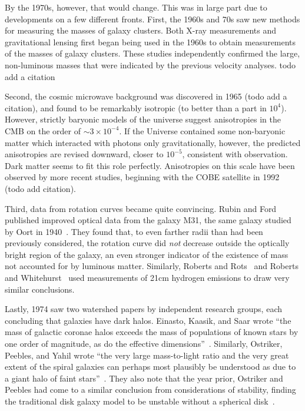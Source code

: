 By the 1970s, however, that would change. This was in large part due to
developments on a few different fronts. First, the 1960s and 70s saw new
methods for measuring the masses of galaxy clusters. Both X-ray measurements
and gravitational lensing first began being used in the 1960s to obtain
measurements of the masses of galaxy clusters. These studies independently
confirmed the large, non-luminous masses that were indicated by the previous
velocity analyses. todo add a citation

Second, the cosmic microwave background was discovered in 1965 (todo add a
citation), and found to be remarkably isotropic (to better than a part in
\(10^4\)). However, strictly baryonic models of the universe suggest
anisotropies in the CMB on the order of \(\sim 3 \times 10^{-4}\). If the
Universe contained some non-baryonic matter which interacted with photons only
gravitationally, however, the predicted anisotropies are revised downward,
closer to \(10^{-5}\), consistent with observation. Dark matter seems to fit
this role perfectly. Anisotropies on this scale have been observed by more
recent studies, beginning with the COBE satellite in 1992 (todo add citation).

Third, data from rotation curves became quite convincing. Rubin and Ford
published improved optical data from the galaxy M31, the same galaxy studied
by Oort in 1940~\cite{rubin_rotation_1970}. They found that, to even farther
radii than had been previously considered, the rotation curve did \emph{not}
decrease outside the optically bright region of the galaxy, an even stronger
indicator of the existence of mass not accounted for by luminous matter.
Similarly, Roberts and Rots~\cite{roberts_comparison_1973} and Roberts and
Whitehurst~\cite{roberts_rotation_1975} used measurements of 21cm hydrogen
emissions to draw very similar conclusions.

Lastly, 1974 saw two watershed papers by independent research groups, each
concluding that galaxies have dark halos. Einasto, Kaasik, and Saar wrote
``the mass of galactic coronae halos exceeds the mass of populations of known
stars by one order of magnitude, as do the effective
dimensions''~\cite{einasto_missing_1974}. Similarly, Ostriker, Peebles, and
Yahil wrote ``the very large mass-to-light ratio and the very great extent of
the spiral galaxies can perhaps most plausibly be understood as due to a giant
halo of faint stars''~\cite{ostriker_size_1974}. They also note that the year
prior, Ostriker and Peebles had come to a similar conclusion from
considerations of stability, finding the traditional disk galaxy model to be
unstable without a spherical disk~\cite{ostriker_numerical_1973}.

